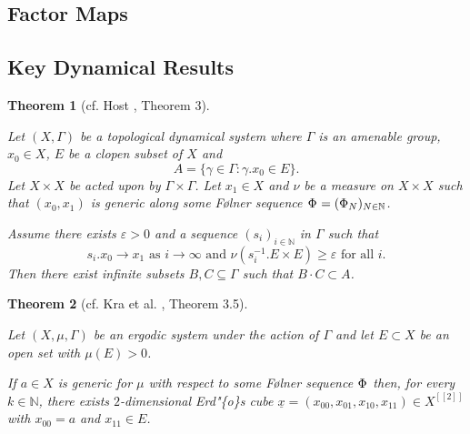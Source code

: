 \documentclass[
  british,
]{article}
\theoremstyle{definition}
\theoremstyle{plain}
\theoremstyle{plain}
\newtheorem{theorem}{Theorem}[section]
\theoremstyle{remark}
\newcommand{\AmenableGroup}{{\Gamma}}
\newcommand{\Measure}{{\mu}}
\newcommand{\Folner}[1][\vphantom{}]{{\Phi}_{#1}}
\newcommand{\GroupAction}[2]{{#1}.{#2}}
\newcommand{\AmenableGroupElement}{{\gamma}}
\newcommand{\N}{\mathbb{N}}
\newcommand{\GroupOperation}[2]{{#1}\cdot{#2}}
\begin{document}
\subsection{Factor Maps}\label{factor-maps}

\subsection{Key Dynamical Results}\label{key-dynamical-results}

\begin{theorem}[cf. Host , Theorem
3]\protect\hypertarget{thm-GenErdosConjDyn}{}\label{thm-GenErdosConjDyn}

Let \((X,\AmenableGroup)\) be a topological dynamical system where
\(\AmenableGroup\) is an amenable group, \(x_0\in X\), \(E\) be a clopen
subset of \(X\) and
\[A=\{\AmenableGroupElement\in\AmenableGroup:\GroupAction{\AmenableGroupElement}{x_0}\in E\}.\]
Let \(X\times X\) be acted upon by
\(\AmenableGroup\times\AmenableGroup\). Let \(x_1\in X\) and \(\nu\) be
a measure on \(X\times X\) such that \((x_0,x_1)\) is generic along some
Følner sequence \(\Folner=(\Folner[N])_{N\in\N}\).

Assume there exists \(\varepsilon>0\) and a sequence \((s_i)_{i\in\N}\)
in \(\AmenableGroup\) such that
\[\GroupAction{s_i}{x_0}\rightarrow x_1\text{ as }i\rightarrow\infty\text{ and }\nu(\GroupAction{s_i^{-1}}{E}\times E)\geq\varepsilon\text{ for all }i. \]
Then there exist infinite subsets \(B,C\subseteq \AmenableGroup\) such
that \(\GroupOperation{B}{C}\subset A\).

\end{theorem}

\begin{theorem}[cf. Kra et al. ,
Theorem
3.5]\protect\hypertarget{thm-GenErdosConjCube}{}\label{thm-GenErdosConjCube}

Let \((X,\Measure,\AmenableGroup)\) be an ergodic system under the
action of \(\AmenableGroup\) and let \(E\subset X\) be an open set with
\(\Measure(E)>0\).

If \(a\in X\) is generic for \(\Measure\) with respect to some Følner
sequence \(\Folner\) then, for every \(k\in\N\), there exists
\(2\)-dimensional Erd"\{o\}s cube
\(\underline{x}=(x_{00},x_{01},x_{10},x_{11})\in X^{[[2]]}\) with
\(x_{00}=a\) and \(x_{11}\in E\).

\end{theorem}
\end{document}
